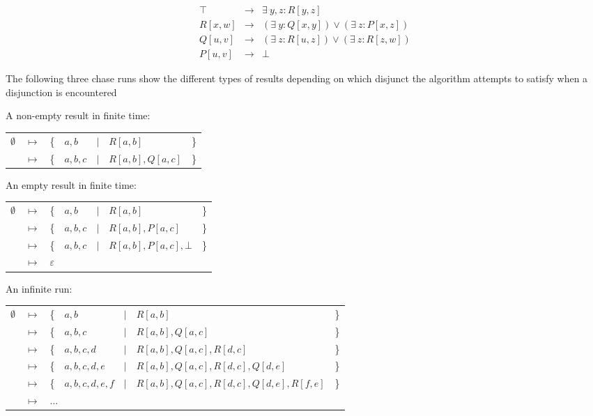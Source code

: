 		\begin{eqnarray}
			\top    &  \to  &  \exists\ y,z : R[y,z]                             \\
			R[x,w]  &  \to  &  (\exists\ y : Q[x,y]) \vee (\exists\ z : P[x,z])  \\
			Q[u,v]  &  \to  &  (\exists\ z : R[u,z]) \vee (\exists\ z : R[z,w])  \\
			P[u,v]  &  \to  &  \bot
		\end{eqnarray}

		The following three chase runs show the different types of results
		depending on which disjunct the algorithm attempts to satisfy when a
		disjunction is encountered

		A non-empty result in finite time:

		\begin{tabular}{lllllll}
			$\emptyset$ & $\mapsto$ & \{ & $a,b$   & $|$ & $R[a,b]$         & \} \\
			{}          & $\mapsto$ & \{ & $a,b,c$ & $|$ & $R[a,b], Q[a,c]$ & \} \\
		\end{tabular}

		An empty result in finite time:

		\begin{tabular}{lllllll}
			$\emptyset$ & $\mapsto$ & \{ & $a,b$   & $|$ & $R[a,b]$               & \} \\
			{}          & $\mapsto$ & \{ & $a,b,c$ & $|$ & $R[a,b], P[a,c]$       & \} \\
			{}          & $\mapsto$ & \{ & $a,b,c$ & $|$ & $R[a,b], P[a,c], \bot$ & \} \\
			{}          & $\mapsto$ & \multicolumn{5}{l}{ $\varepsilon$ } \\
		\end{tabular}

		An infinite run:

		\begin{tabular}{lllllll}
			$\emptyset$ & $\mapsto$ & \{ & $a,b$         & $|$ & $R[a,b]$                                 & \} \\
			{}          & $\mapsto$ & \{ & $a,b,c$       & $|$ & $R[a,b], Q[a,c]$                         & \} \\
			{}          & $\mapsto$ & \{ & $a,b,c,d$     & $|$ & $R[a,b], Q[a,c], R[d,c]$                 & \} \\
			{}          & $\mapsto$ & \{ & $a,b,c,d,e$   & $|$ & $R[a,b], Q[a,c], R[d,c], Q[d,e]$         & \} \\
			{}          & $\mapsto$ & \{ & $a,b,c,d,e,f$ & $|$ & $R[a,b], Q[a,c], R[d,c], Q[d,e], R[f,e]$ & \} \\
			{}          & $\mapsto$ & \multicolumn{5}{l}{ $\ldots$ } \\
		\end{tabular}
